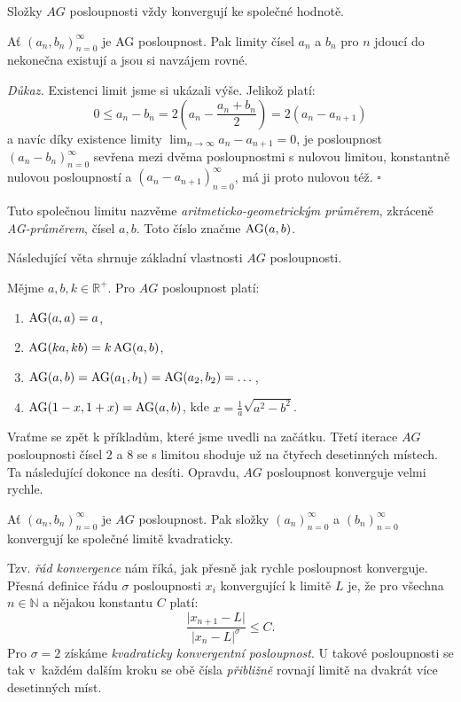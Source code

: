 \documentclass[12pt]{report}
\begin{document}
Složky $AG$ posloupnosti vždy konvergují ke společné hodnotě.
\begin{veta}\label{conv}
Ať $(a_n,b_n)_{n=0} ^{\infty}$ je AG posloupnost. Pak limity čísel $a_n$ a $b_n$ pro $n$ jdoucí do nekonečna existují a jsou si navzájem rovné. 
\end{veta}
\noindent \textit{Důkaz.} Existenci limit jsme si ukázali výše. Jelikož platí:
$$ 0 \leqslant a_n - b_n  =  2 \left( a_n - \frac{a_n+ b_n}{2} \right) = 2 ( a_{n} - a_{n+1} )$$
a navíc díky existence limity $\lim_{n \rightarrow \infty} a_n - a_{n+1} = 0$, je posloupnost $(a_n-b_n)_{n=0}^{\infty}$ sevřena mezi dvěma posloupnostmi s nulovou limitou, konstantně nulovou posloupností a $(a_{n}-a_{n+1})_{n=0}^{\infty}$, má ji proto nulovou též. \hfill $\square$


\begin{definice}
Tuto společnou limitu nazvěme \textit{aritmeticko-geometrickým průměrem}, zkráceně \textit{AG-průměrem}, čísel $a,b$. Toto číslo značme $\operatorname{AG}(a,b)$.
\end{definice}


Následující věta shrnuje základní vlastnosti $AG$ posloupnosti. 

\begin{veta}\label{zkjb}
Mějme $a,b,k \in \mathbb{R}^{+}$. Pro $AG$ posloupnost platí:
\begin{enumerate}
\item $\operatorname{AG}(a,a) = a$,
\item $\operatorname{AG}(ka,kb) = k \operatorname{AG} (a,b)$,
\item $\operatorname{AG}(a,b) = \operatorname{AG}(a_1,b_1) = \operatorname{AG}(a_2,b_2) = \dots$,
\item $\operatorname{AG}(1-x,1+x) = \operatorname{AG}(a,b)$, kde $x = \frac{1}{a} \sqrt{a^2 - b^2}$.
\end{enumerate}
\end{veta}


Vraťme se zpět k příkladům, které jsme uvedli na začátku. Třetí iterace $AG$ posloupnosti čísel $2$ a $8$ se s limitou shoduje už na čtyřech desetinných místech. Ta následující dokonce na desíti. Opravdu, $AG$ posloupnost konverguje velmi rychle.
\begin{veta}\label{konverg}
Ať $(a_n,b_n)_{n=0}^{\infty}$ je $AG$ posloupnost. Pak složky $(a_n)_{n=0}^{\infty}$ a $(b_n)_{n=0}^{\infty}$ konvergují ke společné limitě kvadraticky.
\end{veta}
Tzv. \textit{řád konvergence} nám říká, jak přesně jak rychle posloupnost konverguje. Přesná definice řádu $\sigma$ posloupnosti $x_i$ konvergující k limitě $L$ je, že pro všechna $n \in \mathbb{N}$ a nějakou konstantu $C$ platí:
$$\frac{\vert x_{n+1} - L \vert}{\vert x_n - L \vert ^ \sigma} \leqslant C.$$
Pro $\sigma = 2$ získáme \textit{kvadraticky konvergentní posloupnost}. U takové posloupnosti se tak v~každém dalším kroku se obě čísla \textit{přibližně} rovnají limitě na dvakrát více desetinných míst.
\end{document}
